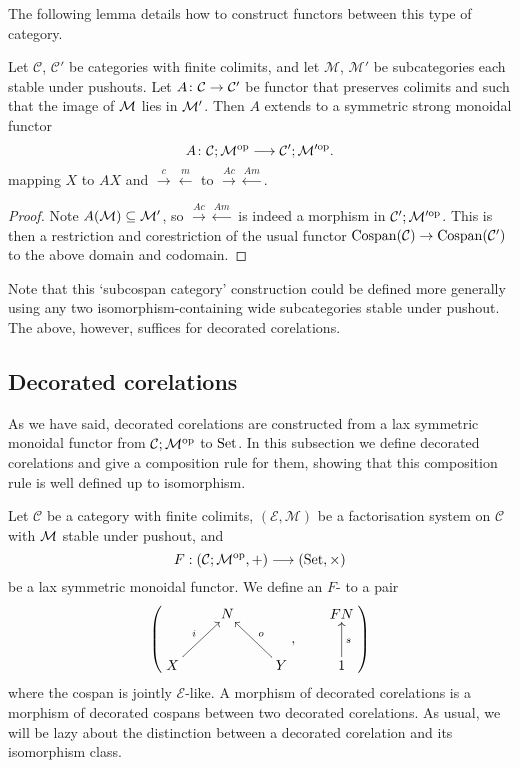 The following lemma details how to construct functors between this type of
category.

\begin{lemma} \label{lem.madjointsfunctor}
  Let $\mathcal C$, $\mathcal C'$ be categories with finite colimits, and let
  $\mathcal M$, $\mathcal M'$ be subcategories each stable under pushouts. Let
  $A{\colon} \mathcal C \to \mathcal C'$ be functor that preserves colimits and such
  that the image of $\mathcal M$ lies in $\mathcal M'$. Then $A$ extends to a symmetric
  strong monoidal functor
  \[
    A{\colon} \mathcal C;\mathcal M^{\mathrm{op}} \longrightarrow \mathcal C'; \mathcal M'^{\mathrm{op}}.
  \]
  mapping $X$ to $AX$ and $\stackrel{c}\rightarrow \stackrel{m}\leftarrow$ to
  $\stackrel{Ac}\rightarrow \stackrel{Am}\leftarrow$.
\end{lemma}
\begin{proof}
  Note $A(\mathcal M) \subseteq \mathcal M'$, so $\stackrel{Ac}\rightarrow
  \stackrel{Am}\leftarrow$ is indeed a morphism in $\mathcal C';\mathcal M'^{\mathrm{op}}$. This is
  then a restriction and corestriction of the usual functor $\operatorname{{Cospan}}(\mathcal C) \to
  \operatorname{{Cospan}}(\mathcal C')$ to the above domain and codomain.
\end{proof}

Note that this `subcospan category' construction could be defined more generally
using any two isomorphism-containing wide subcategories stable under pushout.
The above, however, suffices for decorated corelations.

\subsection{Decorated corelations} \label{ssec.deccorel}

As we have said, decorated corelations are constructed from a lax symmetric
monoidal functor from $\mathcal C;\mathcal M^{\mathrm{op}}$ to $\mathrm{Set}$. In this subsection we define
decorated corelations and give a composition rule for them, showing that this
composition rule is well defined up to isomorphism.

\begin{definition}
  Let $\mathcal C$ be a category with finite colimits, $(\mathcal E, \mathcal
  M)$ be a factorisation system on $\mathcal C$ with $\mathcal M$ stable under
  pushout, and 
  \[
    F: (\mathcal C;\mathcal M^{\mathrm{op}},+) \longrightarrow (\mathrm{Set}, \times)
  \]
  be a lax symmetric monoidal functor.  We define an $F$- to a pair
  \[
    \left(
    \begin{aligned}
      \xymatrix{
	& N \\  
	X \ar[ur]^{i} && Y \ar[ul]_{o}
      }
    \end{aligned}
    ,
    \qquad
    \begin{aligned}
      \xymatrix{
	FN \\
	1 \ar[u]_{s}
      }
    \end{aligned}
    \right)
  \]
  where the cospan is jointly $\mathcal E$-like. A morphism of decorated
  corelations is a morphism of decorated cospans between two decorated
  corelations.  As usual, we will be lazy about the distinction between a
  decorated corelation and its isomorphism class.
\end{definition}


